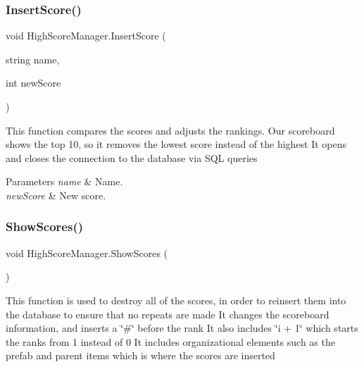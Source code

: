 \subsubsection{\texorpdfstring{Insert\+Score()}{InsertScore()}}
{\footnotesize\ttfamily void High\+Score\+Manager.\+Insert\+Score (\begin{DoxyParamCaption}\item[{string}]{name,  }\item[{int}]{new\+Score }\end{DoxyParamCaption})\hspace{0.3cm}{\ttfamily [private]}}



This function compares the scores and adjusts the rankings. Our scoreboard shows the top 10, so it removes the lowest score instead of the highest It opens and closes the connection to the database via S\+QL queries 


\begin{DoxyParams}{Parameters}
{\em name} & Name.\\
\hline
{\em new\+Score} & New score.\\
\hline
\end{DoxyParams}
\mbox{\label{class_high_score_manager_ab3e52344cd580a8e4e68f741361072e4}} 
\subsubsection{\texorpdfstring{Show\+Scores()}{ShowScores()}}
{\footnotesize\ttfamily void High\+Score\+Manager.\+Show\+Scores (\begin{DoxyParamCaption}{ }\end{DoxyParamCaption})\hspace{0.3cm}{\ttfamily [private]}}



This function is used to destroy all of the scores, in order to reinsert them into the database to ensure that no repeats are made It changes the scoreboard information, and inserts a \char`\"{}\#\char`\"{} before the rank It also includes \char`\"{}i + 1\char`\"{} which starts the ranks from 1 instead of 0 It includes organizational elements such as the prefab and parent items which is where the scores are inserted 

\mbox{\label{class_high_score_manager_acee896a71e1b9f5bb9c486d373331df0}} 
